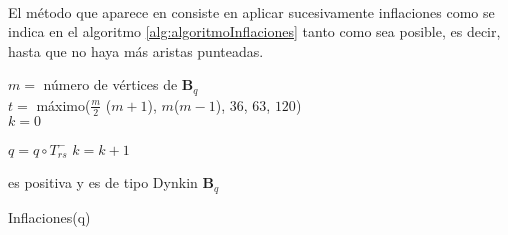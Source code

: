 \paragraph{}
El método que aparece en \citep{alma991031505829703276} consiste en aplicar sucesivamente inflaciones como se indica en el algoritmo \ref{alg:algoritmoInflaciones} tanto como sea posible, es decir, hasta que no haya más aristas punteadas.
\begin{algorithm}[!ht]
\DontPrintSemicolon
  $m =$ número de vértices de $\textbf{B}_{q}$\\
  $t =$ máximo($\frac{m}{2}$ ($m + 1$), $m$($m-1$), $36$, $63$, $120$)\\
  $k = 0$\\
   {
   		$q = q \circ T_{rs}^{-}$\;
   		$k = k + 1$
   		
   }
 \Return es positiva y es de tipo Dynkin $\textbf{B}_{q}$
\caption{Inflaciones(q)}\label{alg:algoritmoInflaciones}
\end{algorithm}

